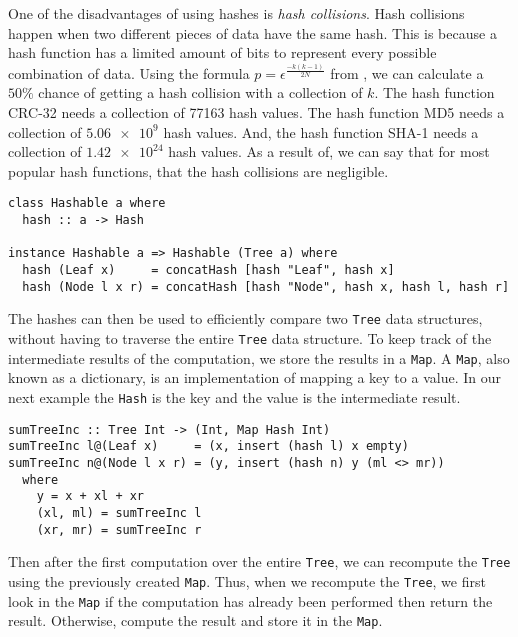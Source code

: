 One of the disadvantages of using hashes is \textit{hash collisions}. Hash collisions happen when two different pieces of data have the same hash. This is because a hash function has a limited amount of bits to represent every possible combination of data. Using the formula $p = \epsilon^{\frac{-k(k-1)}{2N}}$ from \cite{hashcoll2011}, we can calculate a $50\%$ chance of getting a hash collision with a collection of $k$. The hash function CRC-32 needs a collection of 77163 hash values. The hash function MD5 needs a collection of $\num{5.06e9}$ hash values. And, the hash function SHA-1 needs a collection of $\num{1.42e24}$ hash values. As a result of, we can say that for most popular hash functions, that the hash collisions are negligible.


\begin{verbatim}
class Hashable a where
  hash :: a -> Hash

instance Hashable a => Hashable (Tree a) where
  hash (Leaf x)     = concatHash [hash "Leaf", hash x]
  hash (Node l x r) = concatHash [hash "Node", hash x, hash l, hash r]
\end{verbatim}

The hashes can then be used to efficiently compare two \texttt{Tree} data structures, without having to traverse the entire \texttt{Tree} data structure. To keep track of the intermediate results of the computation, we store the results in a \texttt{Map}. A \texttt{Map}, also known as a dictionary, is an implementation of mapping a key to a value. In our next example the \texttt{Hash} is the key and the value is the intermediate result.

\begin{verbatim}
sumTreeInc :: Tree Int -> (Int, Map Hash Int)
sumTreeInc l@(Leaf x)     = (x, insert (hash l) x empty)
sumTreeInc n@(Node l x r) = (y, insert (hash n) y (ml <> mr))
  where
    y = x + xl + xr
    (xl, ml) = sumTreeInc l
    (xr, mr) = sumTreeInc r
\end{verbatim}

Then after the first computation over the entire \texttt{Tree}, we can recompute the \texttt{Tree} using the previously created \texttt{Map}. Thus, when we recompute the \texttt{Tree}, we first look in the \texttt{Map} if the computation has already been performed then return the result. Otherwise, compute the result and store it in the \texttt{Map}.

